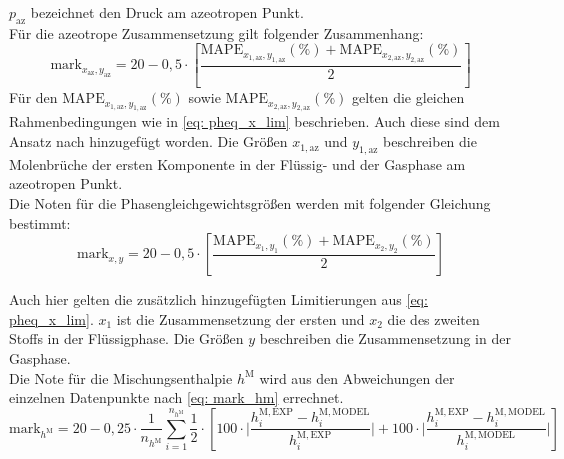 \documentclass[../thesis.tex]{subfiles}
\begin{document}
$ p_\mathrm{az} $ bezeichnet den Druck am azeotropen Punkt.
\\

Für die azeotrope Zusammensetzung gilt folgender Zusammenhang:
\begin{equation}
\mathrm{mark}_{x_\mathrm{az},y_\mathrm{az}} = 20 - 0,5 \cdot \left[
	\dfrac{\mathrm{MAPE}_{x_{1,\mathrm{az}},y_{1,\mathrm{az}}}(\%) + \mathrm{MAPE}_{x_{2,\mathrm{az}},y_{2,\mathrm{az}}}(\%)}{2}
\right]
\end{equation}
Für den $ \mathrm{MAPE}_{x_{1,\mathrm{az}},y_{1,\mathrm{az}}}(\%) $ sowie $ \mathrm{MAPE}_{x_{2,\mathrm{az}},y_{2,\mathrm{az}}}(\%) $ gelten die gleichen Rahmenbedingungen wie in \autoref{eq: pheq_x_lim} beschrieben. Auch diese sind dem Ansatz nach \cite{jaubert2020benchmark} hinzugefügt worden. Die Größen $ x_{1,\mathrm{az}} $ und $ y_{1,\mathrm{az}} $ beschreiben die Molenbrüche der ersten Komponente in der Flüssig- und der Gasphase am azeotropen Punkt. 
\\

Die Noten für die Phasengleichgewichtsgrößen werden mit folgender Gleichung bestimmt:
\begin{equation}
	\mathrm{mark}_{x,y} = 20 - 0,5 \cdot \left[
		\dfrac{\mathrm{MAPE}_{x_1,y_1}(\%) + \mathrm{MAPE}_{x_2,y_2}(\%)}{2}
	\right]
\end{equation}

Auch hier gelten die zusätzlich hinzugefügten Limitierungen aus \autoref{eq: pheq_x_lim}.
$x_1$ ist die Zusammensetzung der ersten und $x_2$ die des zweiten Stoffs in der Flüssigphase. Die Größen $ y $ beschreiben die Zusammensetzung in der Gasphase.
\\

Die Note für die Mischungsenthalpie $ h^{\mathrm{M}} $ wird aus den Abweichungen der einzelnen Datenpunkte nach \autoref{eq: mark_hm} errechnet.
\begin{equation}
\mathrm{mark}_{h^{\mathrm{M}}} = 20 - 0,25 \cdot \dfrac{1}{n_{h^{\mathrm{M}}}} \sum_{i=1}^{n_{h^{\mathrm{M}}}}
	\dfrac{1}{2} \cdot \left[
		100 \cdot \biggl|
			\dfrac{h_i^{\mathrm{M,EXP}}-h_i^{\mathrm{M,MODEL}}}{h_i^{\mathrm{M,EXP}}} 
			\biggl| 
			+ 100 \cdot \biggl| \dfrac{h_i^{\mathrm{M,EXP}}-h_i^{\mathrm{M,MODEL}}}{h_i^{\mathrm{M,MODEL}}}
		\biggl|
	\right]
\label{eq: mark_hm}
\end{equation}
\end{document}
